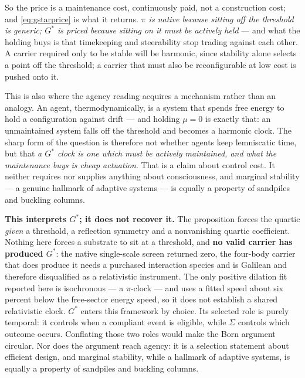 \documentclass[11pt,a4paper]{article}
\theoremstyle{definition}
\theoremstyle{plain}
\theoremstyle{remark}
\begin{document}
So the price is a maintenance cost, continuously paid, not a construction
cost; and \eqref{eq:gstarprice} is what it returns. \emph{$\pi$ is native
because sitting off the threshold is generic; $G^*$ is priced because
sitting on it must be actively held} --- and what the holding buys is that
timekeeping and steerability stop trading against each other. A carrier
required only to be stable will be harmonic, since stability alone selects
a point off the threshold; a carrier that must also be reconfigurable at
low cost is pushed onto it.

This is also where the agency reading acquires a mechanism rather than an
analogy. An agent, thermodynamically, is a system that spends free energy
to hold a configuration against drift --- and holding $\mu = 0$ is exactly
that: an unmaintained system falls off the threshold and becomes a
harmonic clock. The sharp form of the question is therefore not whether
agents keep lemniscatic time, but that \emph{a $G^*$ clock is one which
must be actively maintained, and what the maintenance buys is cheap
actuation}. That is a claim about control cost. It neither requires nor
supplies anything about consciousness, and marginal stability --- a
genuine hallmark of adaptive systems --- is equally a property of sandpiles
and buckling columns.

\begin{scopebox}
\textbf{This interprets $G^*$; it does not recover it.} The proposition
forces the quartic \emph{given} a threshold, a reflection symmetry and a
nonvanishing quartic coefficient. Nothing here forces a substrate to sit
at a threshold, and \textbf{no valid carrier has produced $G^*$}: the
native single-scale screen returned zero, the four-body carrier that does
produce it needs a purchased interaction species and is Galilean and
therefore disqualified as a relativistic instrument. The only positive
dilation fit reported here is isochronous --- a $\pi$-clock --- and uses a
fitted speed about six percent below the free-sector energy speed, so it
does not establish a shared relativistic clock.
$G^*$ enters this framework by choice. Its selected role is purely temporal:
it controls when a compliant event is eligible, while $\Sigma$ controls which
outcome occurs. Conflating those two roles would make the Born argument
circular. Nor does the argument reach
agency: it is a selection statement about efficient design, and marginal
stability, while a hallmark of adaptive systems, is equally a property of
sandpiles and buckling columns.
\end{scopebox}
\end{document}
